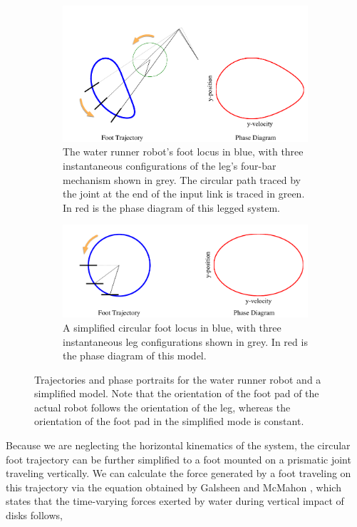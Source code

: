 \begin{figure}[tb]
	\centering
	\begin{subfigure}[t]{0.22\textwidth}
		\centering
		\includegraphics[width = \textwidth]{figures/foot_trajs.pdf}
		\caption{The water runner robot's foot locus in blue, with three instantaneous configurations of the leg's four-bar mechanism shown in grey. The circular path traced by the joint at the end of the input link is traced in green. In red is the phase diagram of this legged system.}
		\label{fig:trajrob}
	\end{subfigure}
    \begin{subfigure}[t]{0.22\textwidth}
		\centering
		\includegraphics[width = \textwidth]{figures/foot_trajs2.pdf}
		\caption{A simplified circular foot locus in blue, with three instantaneous leg configurations shown in grey. In red is the phase diagram of this model.}
		\label{fig:trajsimp}
	\end{subfigure}
	\caption{Trajectories and phase portraits for the water runner robot and a simplified model. Note that the orientation of the foot pad of the actual robot follows the orientation of the leg, whereas the orientation of the foot pad in the simplified mode is constant.}
	\label{fig:traj}
\end{figure}

Because we are neglecting the horizontal kinematics of the system, the circular foot trajectory can be further simplified to a foot mounted on a prismatic joint traveling vertically. We can calculate the force generated by a foot traveling on this trajectory via the equation obtained by Galsheen and McMahon \cite{glasheen1996vertical}, which states that the time-varying forces exerted by water during vertical impact of disks follows,

